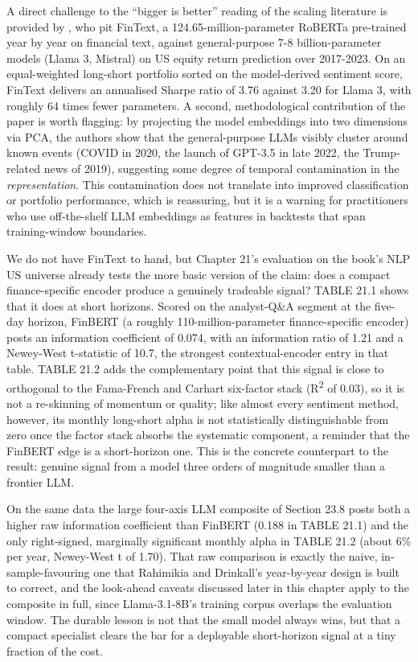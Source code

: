 A direct challenge to the ``bigger is better'' reading of the scaling literature is provided by \cite{rahimikia2024revisiting}, who pit FinText, a 124.65-million-parameter RoBERTa pre-trained year by year on financial text, against general-purpose 7-8 billion-parameter models (Llama 3, Mistral) on US equity return prediction over 2017-2023. On an equal-weighted long-short portfolio sorted on the model-derived sentiment score, FinText delivers an annualised Sharpe ratio of 3.76 against 3.20 for Llama 3, with roughly 64 times fewer parameters. A second, methodological contribution of the paper is worth flagging: by projecting the model embeddings into two dimensions via PCA, the authors show that the general-purpose LLMs visibly cluster around known events (COVID in 2020, the launch of GPT-3.5 in late 2022, the Trump-related news of 2019), suggesting some degree of temporal contamination in the \textit{representation}. This contamination does not translate into improved classification or portfolio performance, which is reassuring, but it is a warning for practitioners who use off-the-shelf LLM embeddings as features in backtests that span training-window boundaries.

We do not have FinText to hand, but Chapter 21's evaluation on the book's NLP US universe already tests the more basic version of the claim: does a compact finance-specific encoder produce a genuinely tradeable signal? TABLE 21.1 shows that it does at short horizons. Scored on the analyst-Q\&A segment at the five-day horizon, FinBERT (a roughly 110-million-parameter finance-specific encoder) posts an information coefficient of 0.074, with an information ratio of 1.21 and a Newey-West t-statistic of 10.7, the strongest contextual-encoder entry in that table. TABLE 21.2 adds the complementary point that this signal is close to orthogonal to the Fama-French and Carhart six-factor stack (R\textsuperscript{2} of 0.03), so it is not a re-skinning of momentum or quality; like almost every sentiment method, however, its monthly long-short alpha is not statistically distinguishable from zero once the factor stack absorbs the systematic component, a reminder that the FinBERT edge is a short-horizon one. This is the concrete counterpart to the \cite{rahimikia2024revisiting} result: genuine signal from a model three orders of magnitude smaller than a frontier LLM.

On the same data the large four-axis LLM composite of Section 23.8 posts both a higher raw information coefficient than FinBERT (0.188 in TABLE 21.1) and the only right-signed, marginally significant monthly alpha in TABLE 21.2 (about 6\% per year, Newey-West t of 1.70). That raw comparison is exactly the naive, in-sample-favouring one that Rahimikia and Drinkall's year-by-year design is built to correct, and the look-ahead caveats discussed later in this chapter apply to the composite in full, since Llama-3.1-8B's training corpus overlaps the evaluation window. The durable lesson is not that the small model always wins, but that a compact specialist clears the bar for a deployable short-horizon signal at a tiny fraction of the cost.

